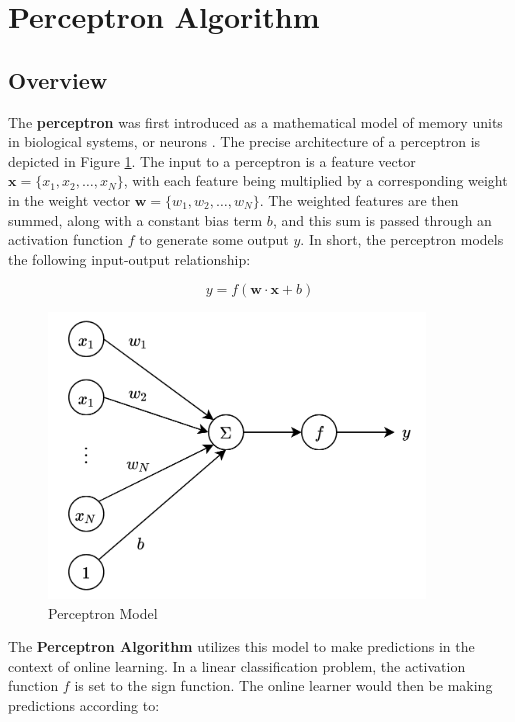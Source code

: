 \documentclass[11pt]{article}
\begin{document}
\section{Perceptron Algorithm}\label{section:perceptron}

\subsection{Overview}

The \textbf{perceptron} was first introduced as a mathematical model of memory units in biological systems, or neurons  \cite{rosenblatt}. The precise architecture of a perceptron is depicted in Figure \ref{fig:perceptron}. The input to a perceptron is a feature vector $\boldsymbol{x} = \{x_1, x_2,\dots, x_N\}$, with each feature being multiplied by a corresponding weight in the weight vector $\boldsymbol{w}=\{w_1, w_2,\dots, w_N\}$. The weighted features are then summed, along with a constant bias term $b$, and this sum is passed through an activation function $f$ to generate some output $y$. In short, the perceptron models the following input-output relationship:

$$y = f(\boldsymbol{w}\cdot\boldsymbol{x}+b)$$

\begin{figure}[H]
    \centering
    \includegraphics[width=10cm]{Perceptron Diagram.png}
    \caption{Perceptron Model}
    \label{fig:perceptron}
\end{figure}


The \textbf{Perceptron Algorithm} utilizes this model to make predictions in the context of online learning. In a linear classification problem, the activation function $f$ is set to the sign function. The online learner would then be making predictions according to:
\end{document}
